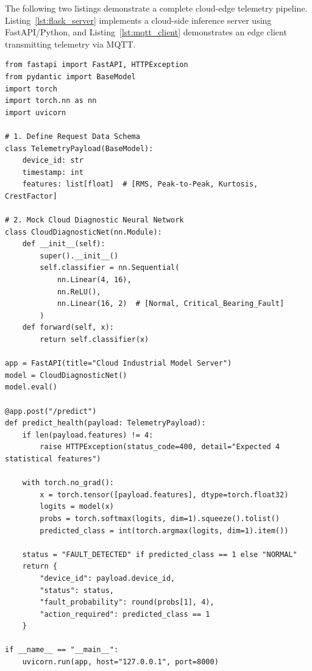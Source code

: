 The following two listings demonstrate a complete cloud-edge telemetry pipeline. Listing~\ref{lst:flask_server} implements a cloud-side inference server using FastAPI/Python, and Listing~\ref{lst:mqtt_client} demonstrates an edge client transmitting telemetry via MQTT.

\begin{lstlisting}[style=pythonstyle, caption={Cloud-side REST inference server using FastAPI and PyTorch.}, label={lst:flask_server}]
from fastapi import FastAPI, HTTPException
from pydantic import BaseModel
import torch
import torch.nn as nn
import uvicorn

# 1. Define Request Data Schema
class TelemetryPayload(BaseModel):
    device_id: str
    timestamp: int
    features: list[float]  # [RMS, Peak-to-Peak, Kurtosis, CrestFactor]

# 2. Mock Cloud Diagnostic Neural Network
class CloudDiagnosticNet(nn.Module):
    def __init__(self):
        super().__init__()
        self.classifier = nn.Sequential(
            nn.Linear(4, 16),
            nn.ReLU(),
            nn.Linear(16, 2)  # [Normal, Critical_Bearing_Fault]
        )
    def forward(self, x):
        return self.classifier(x)

app = FastAPI(title="Cloud Industrial Model Server")
model = CloudDiagnosticNet()
model.eval()

@app.post("/predict")
def predict_health(payload: TelemetryPayload):
    if len(payload.features) != 4:
        raise HTTPException(status_code=400, detail="Expected 4 statistical features")
    
    with torch.no_grad():
        x = torch.tensor([payload.features], dtype=torch.float32)
        logits = model(x)
        probs = torch.softmax(logits, dim=1).squeeze().tolist()
        predicted_class = int(torch.argmax(logits, dim=1).item())
        
    status = "FAULT_DETECTED" if predicted_class == 1 else "NORMAL"
    return {
        "device_id": payload.device_id,
        "status": status,
        "fault_probability": round(probs[1], 4),
        "action_required": predicted_class == 1
    }

if __name__ == "__main__":
    uvicorn.run(app, host="127.0.0.1", port=8000)
\end{lstlisting}

